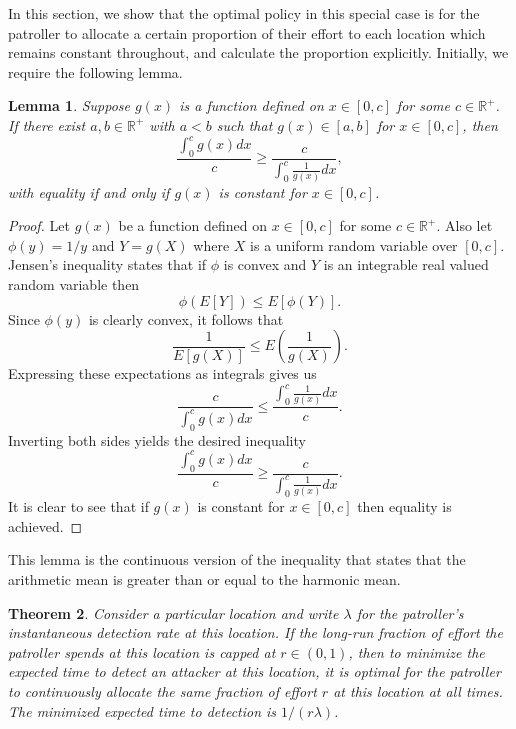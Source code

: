 \documentclass[11pt,a4paper]{article}
\newtheorem{theorem}{Theorem}[section]
\newtheorem{lem}[theorem]{Lemma}
\begin{document}
In this section, we show that the optimal policy in this special case is for the patroller to allocate a certain proportion of their effort to each location which remains constant throughout, and calculate the proportion explicitly.
Initially, we require the following lemma.

\begin{lem}
\label{lem: am>=hm}
Suppose $g(x)$ is a function defined on $x \in [0,c]$ for some $c \in \mathbb{R}^+$.
If there exist $a,b \in \mathbb{R}^+$ with $a < b$ such that $g(x) \in [a,b]$ for $x \in [0,c]$, then
\[
\frac{\int_0^c g(x) dx }{c} \geq \frac{c}{\int_0^c \frac{1}{g(x)} dx},
\]
with equality if and only if $g(x)$ is constant for $x \in [0,c]$.
\end{lem}

\begin{proof}
Let $g(x)$ be a function defined on $x \in [0,c]$ for some $c \in \mathbb{R}^+$.
Also let  $\phi(y) = 1/y$ and $Y = g(X)$ where $X$ is a uniform random variable over $[0,c]$.
Jensen's inequality states that if $\phi$ is convex and $Y$ is an integrable real valued random variable then
$$ \phi( E[Y]) \leq  E[ \phi( Y)]. $$
Since $\phi(y)$ is clearly convex, it follows that 
$$ \frac{1}{E[g(X)]} \leq  E\left(\frac{1}{g(X)}\right).$$
Expressing these expectations as integrals gives us 
$$ \frac{c}{\int_0^c g(x) dx} \leq \frac{\int_0^c \frac{1}{g(x)}dx}{c}.$$
Inverting both sides yields the desired inequality
$$ \frac{\int_0^c g(x) dx }{c} \geq \frac{c}{\int_0^c \frac{1}{g(x)} dx}. $$
It is clear to see that if $g(x)$ is constant for $x \in [0,c] $ then equality is achieved.
\end{proof}
This lemma is the continuous version of the inequality that states that the arithmetic mean is greater than or equal to the harmonic mean.


\begin{theorem}
\label{th:one_location}
Consider a particular location and write $\lambda$ for the patroller's instantaneous detection rate at this location.
If the long-run fraction of effort the patroller spends at this location is capped at $r \in (0,1)$, then to minimize the expected time to detect an attacker at this location, it is optimal for the patroller to continuously allocate the same fraction of effort $r$ at this location at all times.
The minimized expected time to detection is $1 / (r \lambda)$.
\end{theorem}
\end{document}
